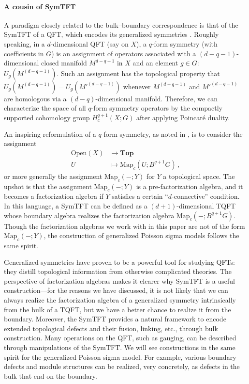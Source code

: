 \documentclass[11pt]{article}
\numberwithin{equation}{section}
\begin{document}
\paragraph{A cousin of SymTFT} A paradigm closely related to the bulk--boundary correspondence is that of the SymTFT \cite{Freed:2022qnc} of a QFT, which encodes its generalized symmetries \cite{Gaiotto:2014kfa}. Roughly speaking, in a $d$-dimensional QFT (say on $X$), a $q$-form symmetry (with coefficients in $G$) is an assignment of operators associated with a $(d-q-1)$-dimensional closed manifold $M^{d-q-1}$ in $X$ and an element $g\in G$: $U_{g}(M^{(d-q-1)})$. Such an assignment has the topological property that $U_{g}(M^{(d-q-1)}) = U_{g}(M'^{(d-q-1)})$ whenever $M^{(d-q-1)}$ and $M'^{(d-q-1)}$ are homologous via a $(d-q)$-dimensional manifold. Therefore, we can characterize the space of all $q$-form symmetry operators by the compactly supported cohomology group $H^{q+1}_c(X;G)$ after applying Poincar\'e duality.

An inspiring reformulation of a $q$-form symmetry, as noted in \cite{Gwilliam:2025vdu,lurie2017higher}, is to consider the assignment
\begin{equation}
\begin{aligned}
	\mathrm{Open}(X) &\to \mathbf{Top}\\
	U &\mapsto \mathrm{Map}_c(U;B^{q+1}G)\,,
\end{aligned}
\end{equation}
or more generally the assignment $\mathrm{Map}_c(-;Y)$ for $Y$ a topological space. The upshot is that the assignment $\mathrm{Map}_c(-;Y)$ is a pre-factorization algebra, and it becomes a factorization algebra if $Y$ satisfies a certain ``$d$-connective'' condition. In this language, a SymTFT can be defined as a $(d+1)$-dimensional TQFT whose boundary algebra realizes the factorization algebra $\mathrm{Map}_c(-;B^{q+1}G)$. Though the factorization algebras we work with in this paper are not of the form $\mathrm{Map}_c(-;Y)$, the construction of generalized Poisson sigma models follows the same spirit.

Generalized symmetries have proven to be a powerful tool for studying QFTs: they distill topological information from otherwise complicated theories. The perspective of factorization algebras makes it clearer why SymTFT is a useful construction---for the reasons we have discussed, it is not likely that we can always realize the factorization algebra of a generalized symmetry intrinsically from the bulk of a TQFT, but we have a better chance to realize it from the boundary. Moreover, the SymTFT provides a natural framework to encode extended topological defects and their fusion, linking, etc., through bulk construction. Many operations on the QFT, such as gauging, can be described through manipulations of the SymTFT. We will see constructions in the same spirit for the generalized Poisson sigma model. For example, various boundary defects and module structures can be realized, very concretely, as defects in the bulk that end on the boundary.
\end{document}
